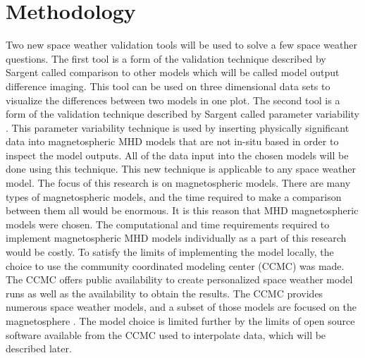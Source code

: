 \section{Methodology}
Two new space weather validation tools will be used to solve a few space
weather questions. The first tool is a form of the validation technique
described by Sargent called comparison to other models which will be called model
output difference imaging. This tool can be used on three dimensional data sets to
visualize the differences between two models in one plot. The second tool is a
form of the validation technique described by Sargent called parameter
variability \cite{Sargent2004}. This parameter variability technique is used by
inserting physically significant data into magnetospheric MHD models that are
not in-situ based in order to inspect the model outputs. All of the data input
into the chosen models will be done using this technique.
This new technique is applicable to any space weather model. The focus of this
research is on magnetospheric models. There are many types of magnetospheric
models, and the time required to make a comparison between them all would be
enormous. It is this reason that MHD magnetospheric models were chosen.
The computational and time requirements required to implement magnetospheric MHD
models individually as a part of this research would be costly. To satisfy the
limits of implementing the model locally, the choice to use the community
coordinated modeling center (CCMC) was made. The CCMC offers public availability
to create personalized space weather model runs as well as the availability to
obtain the results. The CCMC provides numerous space weather models, and a
subset of those models are focused on the magnetosphere \cite{CCMCModels}. The
model choice is limited further by the limits of open source software available
from the CCMC used to interpolate data, which will be described later.

